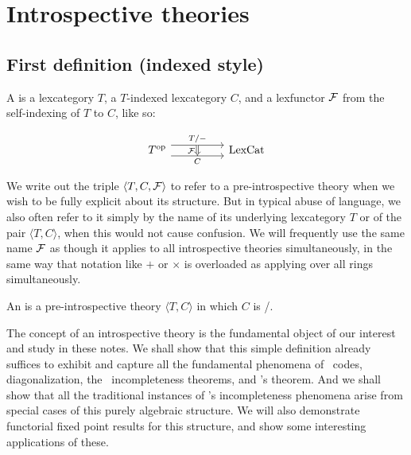 \documentclass[./main.tex]{subfiles}
\begin{document}
\section{Introspective theories}

\subsection{First definition (indexed style)}

\begin{definition} \label{DefnPreIntrospIndexed}
A  is a lexcategory $T$, a $T$-indexed lexcategory $C$, and a lexfunctor $\mathcal{F}$ from the self-indexing of $T$ to $C$, like so:

\[\begin{tikzcd}
	{\op{T}} && {\LexCat}
	\arrow["{T/-}"{name=0}, from=1-1, to=1-3, shift left=2]
	\arrow["{C}"{name=1, swap}, from=1-1, to=1-3, shift right=2]
	\arrow[Rightarrow, "{\introF}"', from=0, to=1]
\end{tikzcd}\]
\end{definition}

We write out the triple $\langle T, C, \mathcal{F} \rangle$ to refer to a pre-introspective theory when we wish to be fully explicit about its structure. But in typical abuse of language, we also often refer to it simply by the name of its underlying lexcategory $T$ or of the pair $\langle T, C \rangle$, when this would not cause confusion. We will frequently use the same name $\mathcal{F}$ as though it applies to all introspective theories simultaneously, in the same way that notation like $+$ or $\times$ is overloaded as applying over all rings simultaneously.

\begin{definition} \label{DefnIntrospIndexed}
An  is a pre-introspective theory $\langle T, C \rangle$ in which $C$ is \repsmall/.
\end{definition}

The concept of an introspective theory is the fundamental object of our interest and study in these notes. We shall show that this simple definition already suffices to exhibit and capture all the fundamental phenomena of \Goedel\ codes, diagonalization, the \Goedel\ incompleteness theorems, and \Loeb's theorem. And we shall show that all the traditional instances of \Goedel's incompleteness phenomena arise from special cases of this purely algebraic structure. We will also demonstrate functorial fixed point results for this structure, and show some interesting applications of these.
\end{document}
